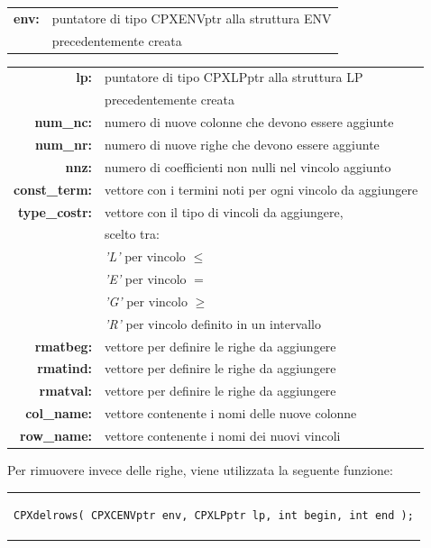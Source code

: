 \begin{table}[h]
\centering
\begin{tabular}{rl}
\textbf{env:} & {puntatore di tipo CPXENVptr alla struttura ENV}\\
& {precedentemente creata}\\
\end{tabular}
\end{table}
\begin{table}[h]
\centering
\begin{tabular}{rl}
\textbf{lp:} & {puntatore di tipo CPXLPptr alla struttura LP}\\
& {precedentemente creata}\\
\textbf{num\_nc:} & {numero di nuove colonne che devono essere aggiunte}\\
\textbf{num\_nr:} & {numero di nuove righe che devono essere aggiunte}\\
\textbf{nnz:} & {numero di coefficienti non nulli nel vincolo aggiunto}\\
\textbf{const\_term:} & {vettore con i termini noti per ogni vincolo da aggiungere}\\
\textbf{type\_costr:} & {vettore con il tipo di vincoli da aggiungere,}\\
&{scelto tra:}\\
&{\textit{'L'} per vincolo $\leq$}\\
&{\textit{'E'} per vincolo $=$}\\
&{\textit{'G'} per vincolo $\geq$}\\
&{\textit{'R'} per vincolo definito in un intervallo}\\
\textbf{rmatbeg:} & {vettore per definire le righe da aggiungere}\\
\textbf{rmatind:} & {vettore per definire le righe da aggiungere}\\
\textbf{rmatval:} & {vettore per definire le righe da aggiungere}\\
\textbf{col\_name:} & {vettore contenente i nomi delle nuove colonne}\\
\textbf{row\_name:} & {vettore contenente i nomi dei nuovi vincoli}\\
\end{tabular}
\end{table}
\vspace{4cm}
Per rimuovere invece delle righe, viene utilizzata la seguente funzione:
\begin{center}
\begin{tabular}{c}
\begin{lstlisting}[linewidth=385pt, basicstyle=\footnotesize\sffamily,]     
CPXdelrows( CPXCENVptr env, CPXLPptr lp, int begin, int end );
\end{lstlisting}
\end{tabular}
\end{center}
